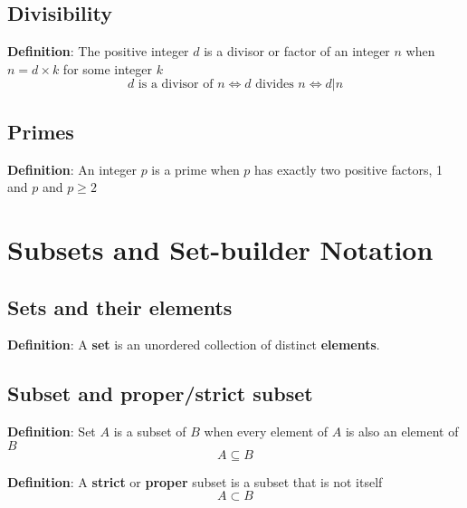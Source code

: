 \subsection{Divisibility}

\begin{framed}

   \textbf{Definition}: The positive integer $d$ is a divisor or factor of an integer $n$ when 
$n = d \times k$ for some integer $k$ \\

\[
  \text{$d$ is a divisor of $n$} \iff \text{$d$ divides $n$} \iff d | n
\] 
\end{framed}

\subsection{Primes}

\begin{framed}
   \textbf{Definition}: An integer $p$ is a prime when $p$ has exactly two positive factors, 1 and $p$ and $p \geq 2$
\end{framed}


\section{Subsets and Set-builder Notation}

\subsection{Sets and their elements}

\begin{framed}
   \textbf{Definition}: A \textbf{set} is an unordered collection of distinct \textbf{elements}.
\end{framed}

\subsection{Subset and proper/strict subset}

\begin{framed}
   \textbf{Definition}: Set $A$ is a subset of $B$ when every element of $A$ is also an element of $B$ 
   \[
     A \subseteq B
   \] 

  \textbf{Definition}: A \textbf{strict} or \textbf{proper} subset is a subset that is not itself 
  \[
    A \subset B
  \] 
  
\end{framed}

